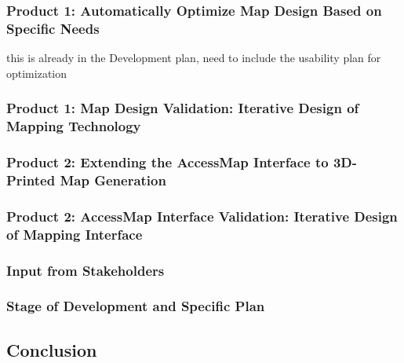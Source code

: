 \subsubsection{Product 1: Automatically Optimize Map Design Based on Specific Needs}
\ac{this is already in the Development plan, need to include the usability plan for optimization}
%

\subsubsection{Product 1: Map Design Validation: Iterative Design of Mapping Technology}
\label{sec:mapping-validation}



\subsubsection{Product 2: Extending the AccessMap Interface to 3D-Printed
Map Generation}
\label{sec:accessmap-extension}



\subsubsection{Product 2: AccessMap Interface Validation: Iterative Design of Mapping Interface}
\label{sec:accessmap-studies}


\subsubsection{Input from Stakeholders}
\label{sec:stakeholder-input}


\subsubsection{Stage of Development and Specific Plan}
\label{sec:stage}
    



\subsection{Conclusion}
